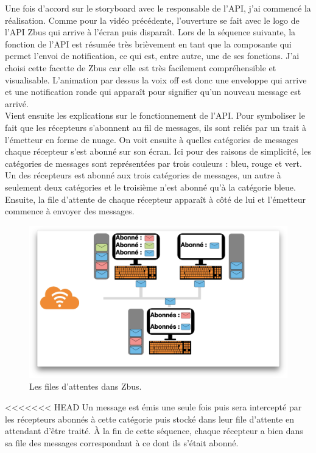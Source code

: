 Une fois d'accord sur le storyboard avec le responsable de l'API, j'ai commencé la réalisation. Comme pour la vidéo précédente, l'ouverture se fait avec le logo de l'API Zbus qui arrive à l'écran puis disparaît. Lors de la séquence suivante, la fonction de l'API est résumée très brièvement en tant que la composante qui permet l'envoi de notification, ce qui est, entre autre, une de ses fonctions. J'ai choisi cette facette de Zbus car elle est très facilement compréhensible et visualisable. L'animation par dessus la voix off est donc une enveloppe qui arrive et une notification ronde qui apparaît pour signifier qu'un nouveau message est arrivé.\\

Vient ensuite les explications sur le fonctionnement de l'API. Pour symboliser le fait que les récepteurs s'abonnent au fil de messages, ils sont reliés par un trait à l'émetteur en forme de nuage. On voit ensuite à quelles catégories de messages chaque récepteur s'est abonné sur son écran. Ici pour des raisons de simplicité, les catégories de messages sont représentées par trois couleurs : bleu, rouge et vert. Un des récepteurs est abonné aux trois catégories de messages, un autre à seulement deux catégories et le troisième n'est abonné qu'à la catégorie bleue. Ensuite, la file d'attente de chaque récepteur apparaît à côté de lui et l'émetteur commence à envoyer des messages. 


\begin{figure}[htp]
  \centering
  \includegraphics[width=15cm]{images/zbus/screensbus.png}
  \caption{Les files d'attentes dans Zbus.}
  \label{screenzbus}
\end{figure}


<<<<<<< HEAD
Un message est émis une seule fois puis sera intercepté par les récepteurs abonnés à cette catégorie puis stocké dans leur file d'attente en attendant d'être traité. À la fin de cette séquence, chaque récepteur a bien dans sa file des messages correspondant à ce dont ils s'était abonné.\\

